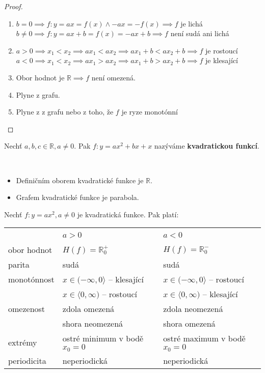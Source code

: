 \begin{proof}
  \begin{enumerate}[1.]
    \item $b=0 \implies f:y= ax = f(x) \land -ax = -f(x) \implies f$ je lichá\\
          $b\neq 0 \implies f:y = ax + b = f(x) = -ax + b \implies f$ není sudá ani lichá
    \item $a>0 \implies x_1 < x_2 \implies ax_1 < ax_2 \implies ax_1 + b < ax_2 + b \implies f$ je rostoucí\\
          $a<0 \implies x_1 < x_2 \implies ax_1 > ax_2 \implies ax_1 + b > ax_2 + b \implies f$ je klesající
    \item Obor hodnot je $\mathbb R \implies f$ není omezená.
    \item Plyne z grafu.
    \item Plyne z z grafu nebo z toho, že $f$ je ryze monotónní
  \end{enumerate}
\end{proof}

\begin{definition}
  Nechť $a,b,c \in \mathbb R, a \neq 0$. Pak $f:y = ax^2 + bx+ x$ nazýváme \textbf{kvadratickou funkcí}.
\end{definition}

\begin{pozn}\,
  \begin{itemize}
    \item Definičním oborem kvadratické funkce je $\mathbb R$.
    \item Grafem kvadratické funkce je parabola.
  \end{itemize}
\end{pozn}

\begin{veta}
  Nechť $f:y = ax^2, a \neq 0$ je kvadratická funkce. Pak platí:\\
  \begin{tabularx}{\textwidth}{ >{\raggedright\arraybackslash}X >{\raggedright\arraybackslash}X >{\raggedright\arraybackslash}X }
    \, & $a>0$ & $a<0$ \\
    obor hodnot & $H(f) = \mathbb R^{+}_0$ & $H(f) = \mathbb R^{-}_0$ \\
    parita & sudá & sudá \\
    monotónnost & $x \in (-\infty, 0\rangle$ -- klesající & $x \in (-\infty, 0\rangle$ -- rostoucí \\
    \, & $x \in \langle 0, \infty)$ -- rostoucí & $x \in \langle 0, \infty)$ -- klesající \\
    omezenost & zdola omezená & zdola neomezená \\
    \, & shora neomezená & shora omezená \\
    extrémy &  ostré minimum v bodě $x_0=0$ & ostré maximum v bodě $x_0=0$ \\
    periodicita & neperiodická & neperiodická
  \end{tabularx}
\end{veta}
